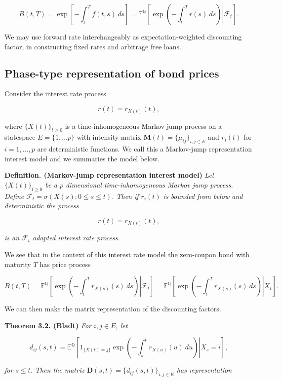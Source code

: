 \documentclass[a4paper,10pt,openany]{book}
\begin{document}
\[
B(t,T)=\exp\left[-\int_t^T f(t,s)\ ds\right]=\mathbb E^{\mathbb Q}\left[\left.\exp\left(-\int_t^T r(s)\ ds\right) \right\vert \mathcal{F}_t\right].
\]

We may use forward rate interchangeably as expectation-weighted discounting factor, in constructing fixed rates and arbitrage free loans.

\hypertarget{phase-type-representation-of-bond-prices}{%
\subsection{Phase-type representation of bond prices}\label{phase-type-representation-of-bond-prices}}

Consider the interest rate process

\[
r(t)=r_{X(t)}(t),
\]

where \(\{X(t)\}_{t\ge 0}\) is a time-inhomogeneous Markov jump process on a statespace \(E=\{1,...p\}\) with intensity matrix \(\mathbf M(t)=\{\mu_{ij}\}_{i,j\in E}\) and \(r_i(t)\) for \(i=1,...,p\) are deterministic functions. We call this a Markov-jump representation interest model and we summaries the model below.

\textbf{Definition. (Markov-jump representation interest model)} \emph{Let \(\{X(t)\}_{t\ge 0}\) be a \(p\) dimensional time-inhomogeneous Markov jump process. Define \(\mathcal F_t=\sigma(X(s) : 0\le s\le t)\). Then if \(r_i(t)\) is bounded from below and deterministic the process}

\[
r(t)=r_{X(t)}(t),
\]

\emph{is an \(\mathcal F_t\) adapted interest rate process.}

We see that in the context of this interest rate model the zero-coupon bond with maturity \(T\) has price process

\[
B(t,T)=\mathbb E^{\mathbb Q}\left[\left.\exp\left(-\int_t^Tr_{X(s)}(s)\ ds\right) \right\vert \mathcal F_t\right]=\mathbb E^{\mathbb Q}\left[\left.\exp\left(-\int_t^Tr_{X(s)}(s)\ ds\right) \right\vert X_t\right].
\]

We can then make the matrix representation of the discounting factors.

\textbf{Theorem 3.2. (Bladt)} \emph{For \(i,j\in E\), let}

\[
d_{ij}(s,t)=\mathbb E^{\mathbb Q}\left[\left.1_{\{X(t)=j\}}\exp\left(-\int_s^tr_{X(u)}(u)\ du\right) \right\vert X_s=i\right],
\]

\emph{for \(s\le t\). Then the matrix \(\mathbf D(s,t)=\{d_{ij}(s,t)\}_{i,j\in E}\) has representation}
\end{document}

